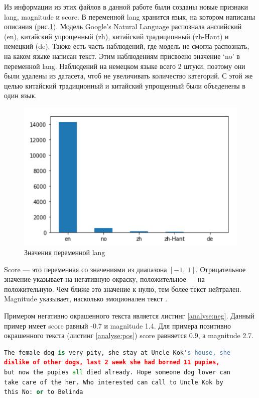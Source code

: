 \documentclass[14pt]{mmcs_article}
\begin{document}
Из информации из этих файлов в данной работе были созданы новые признаки lang, magnitude и score. В переменной lang хранится язык, на котором написаны описания (рис.\ref{analyse:lang}). Модель Google’s Natural Language распознала английский (en), китайский упрощенный (zh), китайский традиционный (zh-Hant) и немецкий (de). Также есть часть наблюдений, где модель не смогла распознать, на каком языке написан текст. Этим наблюдениям присвоено значение `no' в переменной lang. Наблюдений на немецком языке всего 2 штуки, поэтому они были удалены из датасета, чтоб не увеличивать количество категорий. С этой же целью китайский традиционный и китайский упрощенный были объеденены в один язык. 

\begin{figure}[H]
	\centering
	\includegraphics[scale=1.2]{lang.png}
	\caption{Значения переменной lang}\label{analyse:lang}
\end{figure}

Score --- это переменная со значениями из диапазона $[-1,\ 1]$. Отрицательное значение указывает на негативную окраску, положительное --- на положительную. Чем ближе это значение к нулю, тем более текст нейтрален. Magnitude указывает, насколько эмоционален текст \cite{lib:googlelang}.

Примером негативно окрашенного текста является листинг \ref{analyse:neg}. Данный пример имеет score равный -0.7 и magnitude 1.4. Для примера позитивно окрашенного текста (листинг \ref{analyse:pos}) score равняется 0.9, а magnitude 2.7. 

\begin{lstlisting}[language=Python, caption={Пример негативно окрашенного текста}, label=analyse:neg]
The female dog is very pity, she stay at Uncle Kok's house, she 
dislike of other dogs, last 2 week she had borned 11 pupies, 
but now the pupies all died already. Hope someone dog lover can 
take care of the her. Who interested can call to Uncle Kok by 
this No: or to Belinda
\end{lstlisting}
\end{document}
